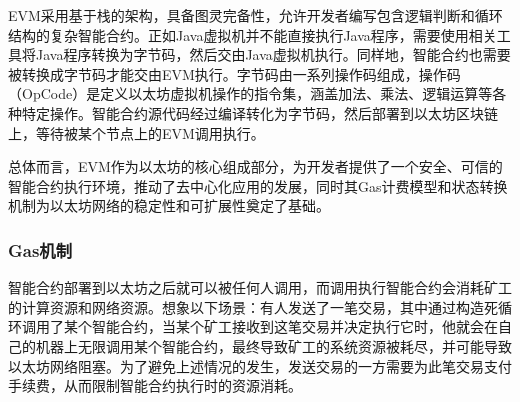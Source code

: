    EVM采用基于栈的架构，具备图灵完备性，允许开发者编写包含逻辑判断和循环结构的复杂智能合约。正如Java虚拟机并不能直接执行Java程序，需要使用相关工具将Java程序转换为字节码，然后交由Java虚拟机执行。同样地，智能合约也需要被转换成字节码才能交由EVM执行。字节码由一系列操作码组成，操作码（OpCode）是定义以太坊虚拟机操作的指令集，涵盖加法、乘法、逻辑运算等各种特定操作。智能合约源代码经过编译转化为字节码，然后部署到以太坊区块链上，等待被某个节点上的EVM调用执行。



    总体而言，EVM作为以太坊的核心组成部分，为开发者提供了一个安全、可信的智能合约执行环境，推动了去中心化应用的发展，同时其Gas计费模型和状态转换机制为以太坊网络的稳定性和可扩展性奠定了基础。   
    
\subsubsection{Gas机制}
    
    智能合约部署到以太坊之后就可以被任何人调用，而调用执行智能合约会消耗矿工的计算资源和网络资源。想象以下场景：有人发送了一笔交易，其中通过构造死循环调用了某个智能合约，当某个矿工接收到这笔交易并决定执行它时，他就会在自己的机器上无限调用某个智能合约，最终导致矿工的系统资源被耗尽，并可能导致以太坊网络阻塞。为了避免上述情况的发生，发送交易的一方需要为此笔交易支付手续费，从而限制智能合约执行时的资源消耗。


